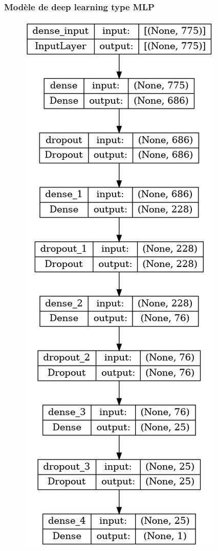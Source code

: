 \documentclass{beamer}
\theoremstyle{definition}
\begin{document}
\begin{frame}
	\frametitle{Modèle de deep learning type MLP }
	\begin{minipage}[t]{1\linewidth}
		\begin{minipage}[t]{0.42\linewidth}\centering\begin{figure}
				\centering
				\includegraphics[width=0.5\linewidth]{model1.png}\\[0.25cm]
				

\end{figure}
\end{minipage}
\end{minipage}
\end{frame}
\end{document}

